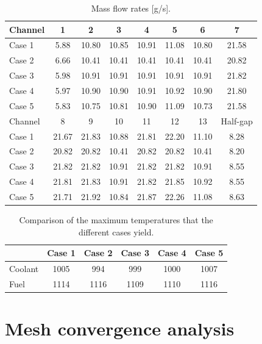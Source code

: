 \begin{table}[htbp!]
  \centering
  \caption{Mass flow rates [g/s].}
  \label{tab:th-assem-flow-massflow}
  \begin{tabular}{l|ccccccc}
\toprule
Channel & 1 & 2 & 3 & 4 & 5 & 6 & 7 \\
\midrule
Case 1  & 5.88 & 10.80 & 10.85 & 10.91 & 11.08 & 10.80 & 21.58 \\
Case 2  & 6.66 & 10.41 & 10.41 & 10.41 & 10.41 & 10.41 & 20.82 \\
Case 3  & 5.98 & 10.91 & 10.91 & 10.91 & 10.91 & 10.91 & 21.82 \\
Case 4  & 5.97 & 10.90 & 10.90 & 10.91 & 10.92 & 10.90 & 21.80 \\
Case 5  & 5.83 & 10.75 & 10.81 & 10.90 & 11.09 & 10.73 & 21.58 \\
\midrule
Channel & 8 & 9 & 10 & 11 & 12 & 13 & Half-gap \\
\midrule
Case 1  & 21.67 & 21.83 & 10.88 & 21.81 & 22.20 & 11.10 & 8.28 \\
Case 2  & 20.82 & 20.82 & 10.41 & 20.82 & 20.82 & 10.41 & 8.20 \\
Case 3  & 21.82 & 21.82 & 10.91 & 21.82 & 21.82 & 10.91 & 8.55 \\
Case 4  & 21.81 & 21.83 & 10.91 & 21.82 & 21.85 & 10.92 & 8.55 \\
Case 5  & 21.71 & 21.92 & 10.84 & 21.87 & 22.26 & 11.08 & 8.63 \\
\bottomrule
\end{tabular}
\end{table}

\begin{table}[htbp!]
  \centering
  \caption{Comparison of the maximum temperatures that the different cases yield.}
  \label{tab:th-assem-flow-results}
\begin{tabular}{l|ccccc}
\toprule
        & Case 1 & Case 2 & Case 3 & Case 4 & Case 5 \\
\midrule
Coolant & 1005   &  994   &  999 & 1000 & 1007 \\
Fuel    & 1114   & 1116   & 1109 & 1110 & 1116 \\
\bottomrule
\end{tabular}
\end{table}

\section{Mesh convergence analysis}

